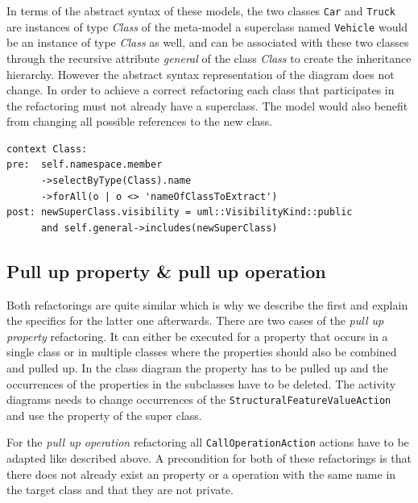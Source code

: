 \documentclass{llncs}
\begin{document}
In terms of the abstract syntax of these models, the two classes \texttt{Car} and \texttt{Truck} are instances of 
type \textit{Class} of the meta-model a superclass named \texttt{Vehicle} would be an instance of type \textit{Class} as well, 
and can be associated with these two classes through the recursive attribute \textit{general} of the class \textit{Class} 
to create the inheritance hierarchy. However the abstract syntax representation of the diagram does not change. In order to 
achieve a correct refactoring each class that participates in the refactoring must not already have a superclass. The 
model would also benefit from changing all possible references to the new class.

\begin{lstlisting}[language=OCL,caption=OCL for extractSuperclass refactoring,label=lst:extractsuperclass]
context Class:
pre:  self.namespace.member
      ->selectByType(Class).name
      ->forAll(o | o <> 'nameOfClassToExtract')
post: newSuperClass.visibility = uml::VisibilityKind::public
      and self.general->includes(newSuperClass)
\end{lstlisting}


\subsection{Pull up property \& pull up operation}
\label{sec:pullup}
Both refactorings are quite similar which is why we describe the first and explain the specifics for the latter one afterwards. 
There are two cases of the \textit{pull up property} refactoring. It can either be executed for a property that occurs in 
a single class or in multiple classes where the properties should also be combined and pulled up. In the class diagram 
the property has to be pulled up and the occurrences of the properties in the subclasses have to be deleted. The 
activity diagrams needs to change occurrences of the \texttt{StructuralFeatureValueAction} and use the property of 
the super class.

For the \textit{pull up operation} refactoring all \texttt{Call\-Operation\-Action} actions have to be adapted like described 
above. A precondition for both of these refactorings is that there does not already exist an property or a operation with the same name 
in the target class and that they are not private.
\end{document}
